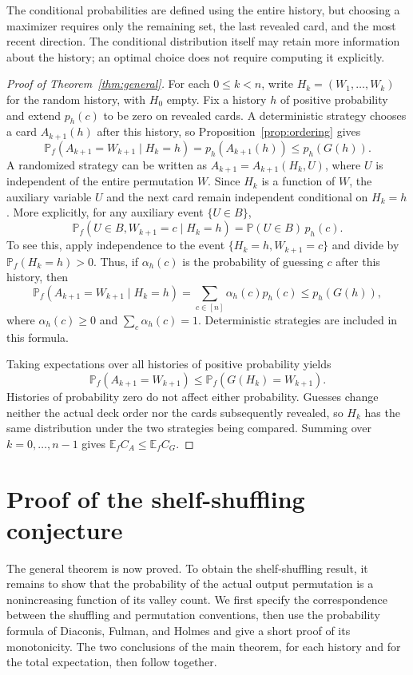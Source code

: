 \documentclass[10pt,a4paper]{amsart}
\numberwithin{equation}{section}
\begin{document}
The conditional probabilities are defined using the entire history, but choosing a maximizer requires only the remaining set, the last revealed card, and the most recent direction. The conditional distribution itself may retain more information about the history; an optimal choice does not require computing it explicitly.

\begin{proof}[Proof of Theorem~\ref{thm:general}]
For each $0\le k<n$, write $H_k=(W_1,\ldots,W_k)$ for the random history, with $H_0$ empty. Fix a history $h$ of positive probability and extend $p_h(c)$ to be zero on revealed cards. A deterministic strategy chooses a card $A_{k+1}(h)$ after this history, so Proposition~\ref{prop:ordering} gives
\[
 \mathbb P_f(A_{k+1}=W_{k+1}\mid H_k=h)
 =p_h(A_{k+1}(h))\le p_h(G(h)).
\]
A randomized strategy can be written as $A_{k+1}=A_{k+1}(H_k,U)$, where $U$ is independent of the entire permutation $W$. Since $H_k$ is a function of $W$, the auxiliary variable $U$ and the next card remain independent conditional on $H_k=h$. More explicitly, for any auxiliary event $\{U\in B\}$,
\[
 \mathbb P_f(U\in B,W_{k+1}=c\mid H_k=h)
 =\mathbb P(U\in B)\,p_h(c).
\]
To see this, apply independence to the event $\{H_k=h,W_{k+1}=c\}$ and divide by $\mathbb P_f(H_k=h)>0$. Thus, if $\alpha_h(c)$ is the probability of guessing $c$ after this history, then
\[
 \mathbb P_f(A_{k+1}=W_{k+1}\mid H_k=h)
 =\sum_{c\in[n]}\alpha_h(c)p_h(c)
 \le p_h(G(h)),
\]
where $\alpha_h(c)\ge0$ and $\sum_c\alpha_h(c)=1$. Deterministic strategies are included in this formula.

Taking expectations over all histories of positive probability yields
\[
 \mathbb P_f(A_{k+1}=W_{k+1})
 \le\mathbb P_f(G(H_k)=W_{k+1}).
\]
Histories of probability zero do not affect either probability. Guesses change neither the actual deck order nor the cards subsequently revealed, so $H_k$ has the same distribution under the two strategies being compared. Summing over $k=0,\ldots,n-1$ gives $\mathbb E_f C_A\le\mathbb E_f C_G$.
\end{proof}
\section{Proof of the shelf-shuffling conjecture}\label{sec:application}
The general theorem is now proved. To obtain the shelf-shuffling result, it remains to show that the probability of the actual output permutation is a nonincreasing function of its valley count. We first specify the correspondence between the shuffling and permutation conventions, then use the probability formula of Diaconis, Fulman, and Holmes and give a short proof of its monotonicity. The two conclusions of the main theorem, for each history and for the total expectation, then follow together.
\end{document}
